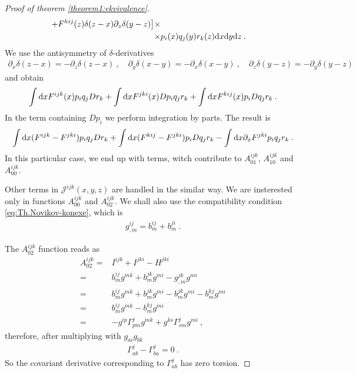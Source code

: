 \begin{proof}[Proof of theorem \ref{theorem1:ekvivalence}]
\begin{align*}
        + F^{kij}(z) \delta(z-x) \partial_z \delta(y-z) \big] \times \\ 
        \times&  p_i(x) q_j(y) r_k(z) \mathrm{d} x \mathrm{d} y \mathrm{d} z \:.
    \end{align*}
    We use the antisymmetry of $\delta$-derivatives
    \begin{align*}
        \partial_x \delta(z-x) = - \partial_z \delta (z-x) \:, \quad 
        \partial_y \delta(x-y) = - \partial_x \delta(x-y) \:, \quad 
        \partial_z \delta(y-z) = - \partial_y \delta (y-z)
    \end{align*}
    and obtain
    \begin{align*}
        \int \mathrm{d} x F^{ijk}(x) p_i q_j D r_k + \int \mathrm{d} x F^{jki}(x) D p_i q_j r_k +
        \int \mathrm{d} x F^{kij}(x) p_i D q_j r_k \:.
    \end{align*}
    In the term containing $D p_i$ we perform integration by parts. The result is
    \begin{align*}
        \int \mathrm{d} x (F^{ijk}-F^{jki}) p_i q_j D r_k +
        \int \mathrm{d} x (F^{kij}-F^{jki}) p_i D q_j r_k -
        \int \mathrm{d} x \partial_x F^{jki} p_i q_j r_k \:.
    \end{align*}
    In this particular case, we end up with terms, witch contribute to $A^{ijk}_{01}$, $A^{ijk}_{10}$ and $A^{ijk}_{00}$.

    Other terms in $\mathcal J^{ijk}(x,y,z)$ are handled in the similar way. We are insterested only in functions $A^{ijk}_{00}$ and $A^{ijk}_{02}$. We shall also use the compatibility condition \eqref{eq:Th.Novikov-konexe}, which is
    \begin{align}
        g^{ij}_{,m} = b^{ij}_m + b^{ji}_m \:.
    \end{align}

    The $A^{ijk}_{02}$ function reads as
    \begin{align*}
        A_{02}^{ijk} =& I^{ijk} + I^{jki} - H^{jki}
        \\ =& b^{ij}_m g^{mk} + b^{jk}_m g^{mi} - g^{jk}_{,m} g^{mi} 
        \\ =& b^{ij}_m g^{mk} + b^{jk}_m g^{mi} - b^{jk}_m g^{mi} - b^{kj}_m g^{mi}
        \\ =& b^{ij}_m g^{mk} - b^{kj}_m g^{mi} 
        \\ =& -g^{ip} \Gamma^{j}_{pm} g^{mk} + g^{ks} \Gamma^{j}_{sm} g^{mi} \:,
    \end{align*}
    therefore, after multiplying with $g_{ai}g_{bk}$
    \begin{align}
        \Gamma^j_{ab} - \Gamma^j_{ba} = 0 \:.
    \end{align}
    So the covariant derivative corresponding to $\Gamma^{j}_{ab}$ has zero torsion.


\end{proof}
